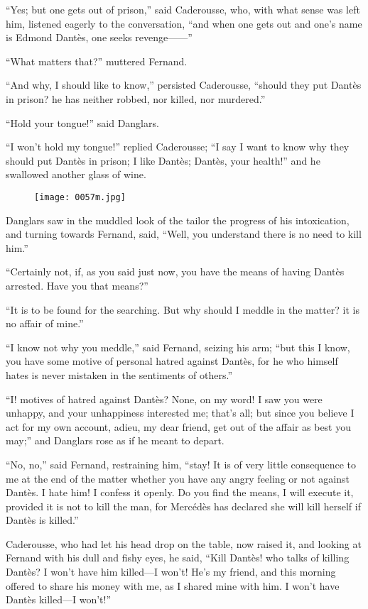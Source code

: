 “Yes; but one gets out of prison,” said Caderousse, who, with what
sense was left him, listened eagerly to the conversation, “and when one
gets out and one’s name is Edmond Dantès, one seeks revenge——”

“What matters that?” muttered Fernand.

“And why, I should like to know,” persisted Caderousse, “should they
put Dantès in prison? he has neither robbed, nor killed, nor murdered.”

“Hold your tongue!” said Danglars.

“I won’t hold my tongue!” replied Caderousse; “I say I want to know why
they should put Dantès in prison; I like Dantès; Dantès, your health!”
and he swallowed another glass of wine.

\begin{figure}[h]
\texttt{[image: 0057m.jpg]}
\end{figure}

Danglars saw in the muddled look of the tailor the progress of his
intoxication, and turning towards Fernand, said, “Well, you understand
there is no need to kill him.”

“Certainly not, if, as you said just now, you have the means of having
Dantès arrested. Have you that means?”

“It is to be found for the searching. But why should I meddle in the
matter? it is no affair of mine.”

“I know not why you meddle,” said Fernand, seizing his arm; “but this I
know, you have some motive of personal hatred against Dantès, for he
who himself hates is never mistaken in the sentiments of others.”

“I! motives of hatred against Dantès? None, on my word! I saw you were
unhappy, and your unhappiness interested me; that’s all; but since you
believe I act for my own account, adieu, my dear friend, get out of the
affair as best you may;” and Danglars rose as if he meant to depart.

“No, no,” said Fernand, restraining him, “stay! It is of very little
consequence to me at the end of the matter whether you have any angry
feeling or not against Dantès. I hate him! I confess it openly. Do you
find the means, I will execute it, provided it is not to kill the man,
for Mercédès has declared she will kill herself if Dantès is killed.”

Caderousse, who had let his head drop on the table, now raised it, and
looking at Fernand with his dull and fishy eyes, he said, “Kill Dantès!
who talks of killing Dantès? I won’t have him killed—I won’t! He’s my
friend, and this morning offered to share his money with me, as I
shared mine with him. I won’t have Dantès killed—I won’t!”

